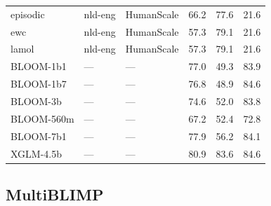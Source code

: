 \begin{table}[t]
\begin{tabular}{lllrrr}
    episodic & nld-eng & HumanScale & 66.2 & 77.6 & 21.6 \\
    ewc & nld-eng & HumanScale & 57.3 & 79.1 & 21.6 \\
    lamol & nld-eng & HumanScale & 57.3 & 79.1 & 21.6 \\
    BLOOM-1b1 & --- & --- & 77.0 & 49.3 & 83.9 \\
    BLOOM-1b7 & --- & --- & 76.8 & 48.9 & 84.6 \\
    BLOOM-3b & --- & --- & 74.6 & 52.0 & 83.8 \\
    BLOOM-560m & --- & --- & 67.2 & 52.4 & 72.8 \\
    BLOOM-7b1 & --- & --- & 77.9 & 56.2 & 84.1 \\
    XGLM-4.5b & --- & --- & 80.9 & 83.6 & 84.6 \\
    \bottomrule
  \end{tabular}
\end{table}


\newpage 
\subsection{MultiBLIMP}


